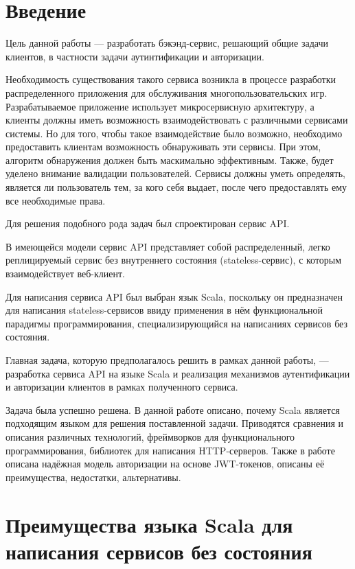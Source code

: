 \documentclass[14pt]{extarticle}
\begin{document}
    \tableofcontents
    \newpage
    \section{Введение}

    Цель данной работы --- разработать бэкэнд-сервис, решающий общие задачи клиентов, в частности задачи аутинтификации и авторизации.

    Необходимость существования такого сервиса возникла в процессе разработки распределенного приложения для
    обслуживания многопользовательских игр.
    Разрабатываемое приложение использует микросервисную архитектуру, а клиенты должны иметь возможность
    взаимодействовать с различными сервисами системы.
    Но для того, чтобы такое взаимодействие было возможно, необходимо предоставить клиентам возможность обнаруживать
    эти сервисы. При этом, алгоритм обнаружения должен быть маскимально эффективным.
    Также, будет уделено внимание валидации пользователей. Сервисы должны уметь определять, является ли пользователь тем,
    за кого себя выдает, после чего предоставлять ему все необходимые права.

    Для решения подобного рода задач был спроектирован сервис API.

    В имеющейся модели сервис API представляет собой распределенный, легко реплицируемый сервис без внутреннего
    состояния (stateless-сервис), с которым взаимодействует веб-клиент.

    Для написания сервиса API был выбран язык Scala\cite{scala}, поскольку он предназначен для написания
    stateless-сервисов ввиду применения в нём функциональной парадигмы программирования, специализирующийся на написаниях сервисов без состояния.

    Главная задача, которую предполагалось решить в рамках данной работы, ---
    разработка сервиса API на языке Scala и реализация механизмов аутентификации и авторизации клиентов в рамках полученного сервиса.

    Задача была успешно решена. В данной работе описано, почему Scala является подходящим языком для решения поставленной задачи.
    Приводятся сравнения и описания различных технологий, фреймворков для функционального программирования, библиотек для написания HTTP-серверов.
    Также в работе описана надёжная модель авторизации на основе JWT-токенов, описаны её преимущества, недостатки, альтернативы.

    \section{Преимущества языка Scala для написания сервисов без состояния}
\end{document}
